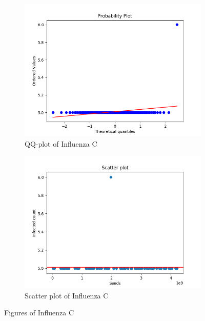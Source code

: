 \documentclass[a4paper]{article}
\begin{document}
\begin{figure}[H]
\begin{subfigure}{.5\textwidth}
  \centering
  \includegraphics[width=1\linewidth]{Influenza_C/Influenza_C-qqplot.png}
  \caption{QQ-plot of Influenza C}
  \label{fig:QQ-plot_Influenza_C}
\end{subfigure}%
\begin{subfigure}{.5\textwidth}
  \centering
  \includegraphics[width=1\linewidth]{Influenza_C/Influenza_C-scatterplot.png}
  \caption{Scatter plot of Influenza C}
  \label{fig:scatterplot_Influenza_C}
\end{subfigure}
\caption{Figures of Influenza C}
\label{fig:Influenza_C }
\end{figure}
\pagebreak
\end{document}
